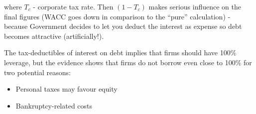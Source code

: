 \documentclass{scrartcl}
\begin{document}
where $T_c$ - corporate tax rate. Then $(1-T_c)$ makes serious influence on the
final figures (WACC goes down in comparison to the ``pure'' calculation) -
because Government decides to let you deduct the interest as expense so debt
becomes attractive (artificially!).

The tax-deductibles of interest on debt implies that firms should have 100\%
leverage, but the evidence shows that firms do not borrow even close to 100\%
for two potential reasons:
\begin{itemize}
\item Personal taxes may favour equity
\item Bankruptcy-related costs
\end{itemize}
 
\end{document}
